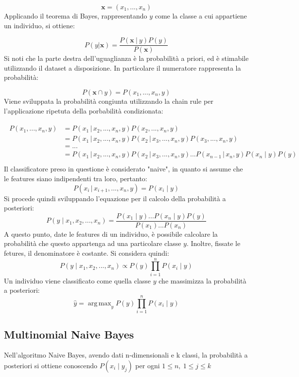 \documentclass[oneside]{book}
\DeclareMathOperator*{\argmax}{arg\,max}
\begin{document}
$$\textbf{x} = (x_1, ..., x_n)$$
Applicando il teorema di Bayes, rappresentando $y$ come la classe a cui appartiene un individuo, si ottiene:

$$P(y|\textbf{x}) =
\frac{P(\textbf{x}\ |\ y)P(y)}{P(\textbf{x})}$$
Si noti che la parte destra dell'uguaglianza è la probabilità a priori, ed è stimabile utilizzando il dataset a disposizione. In particolare il numeratore rappresenta la probabilità:

$$P(\textbf{x} \cap y) = P(x_1, ..., x_n, y)$$
Viene sviluppata la probabilità congiunta utilizzando la chain rule per l'applicazione ripetuta della porbabilità condizionata:




\begin{align}
\begin{split}\label{eq:1}
P(x_1, ..., x_n, y){} &=  P(x_1 \,|\, x_2, ..., x_n, y)P(x_2, ..., x_n, y)\\
&= P(x_1 \,|\, x_2, ..., x_n, y)P(x_2\, |\, x_3, ..., x_n, y)P(x_3, ..., x_n, y)\\
&= ...\\
&= P(x_1 \,|\, x_2, ..., x_n, y)P(x_2\, |\, x_3, ..., x_n, y)...P(x_{n-1}\,|\,x_n,y)P(x_n \mid y)P(y)\\
\end{split}
\end{align}
Il classificatore preso in questione è considerato "naive", in quanto si assume che le features siano indipendenti tra loro, pertanto:
$$P(x_i\,|\, x_{i+1}, ...,x_n, y) = P(x_i \mid y)$$
Si procede quindi sviluppando l'equazione per il calcolo della probabilità a posteriori:
$$P(y \mid x_1, x_2, ..., x_n) =
\frac
	{P(x_1 \mid y)...P(x_n \mid y)P(y)}
	{P(x_1)...P(x_n)}$$
A questo punto, date le features di un individuo, è possibile calcolare la probabilità che questo appartenga ad una particolare classe $y$. Inoltre, fissate le fetures, il denominatore è costante. Si considera quindi:
$$P(y \mid x_1, x_2, ..., x_n) \propto
P(y)\prod\limits_{i=1}^{n}P(x_i \mid y)
$$
Un individuo viene classificato come quella classe $y$ che massimizza la probabilità a posteriori:
$$\hat{y} = \argmax_y P(y)\prod\limits_{i=1}^{n}P(x_i \mid y)$$

\newpage
\subsection{Multinomial Naive Bayes}
Nell'algoritmo Naive Bayes, avendo dati n-dimensionali e k classi, la probabilità a posteriori si ottiene conoscendo $P(x_i \mid y_j)$ per ogni $1\leq n,\ 1\leq j \leq k$
\end{document}
